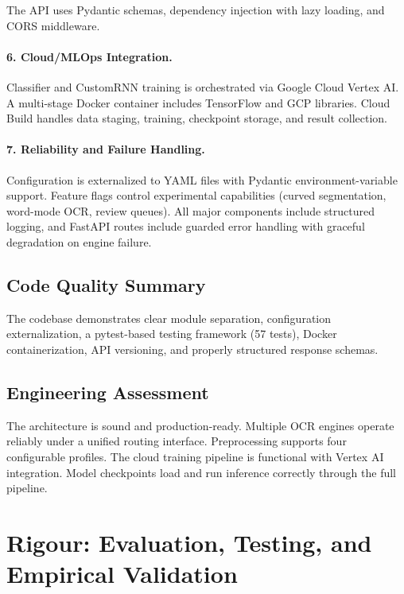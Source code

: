 \documentclass[12pt,a4paper]{article}
\begin{document}
The API uses Pydantic schemas, dependency injection with lazy
loading, and CORS middleware.

\newpage

\paragraph{6. Cloud/MLOps Integration.}

Classifier and CustomRNN training is orchestrated via Google Cloud Vertex AI. A
multi-stage Docker container includes TensorFlow and GCP libraries.
Cloud Build handles data staging, training, checkpoint storage, and
result collection.

\paragraph{7. Reliability and Failure Handling.}

Configuration is externalized to YAML files with Pydantic
environment-variable support. Feature flags control experimental
capabilities (curved segmentation, word-mode OCR, review queues).
All major components include structured logging, and FastAPI routes
include guarded error handling with graceful degradation on engine
failure.

\subsection{Code Quality Summary}

The codebase demonstrates clear module separation, configuration
externalization, a pytest-based testing framework (57 tests), Docker
containerization, API versioning, and properly structured response
schemas.

\subsection{Engineering Assessment}

The architecture is sound and production-ready. Multiple OCR engines
operate reliably under a unified routing interface. Preprocessing
supports four configurable profiles. The cloud training pipeline is
functional with Vertex AI integration. Model checkpoints load and
run inference correctly through the full pipeline.

\newpage

\section{Rigour: Evaluation, Testing, and Empirical Validation}
\end{document}
